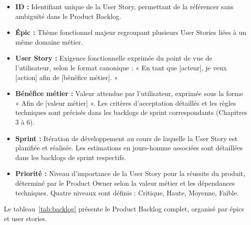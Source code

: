 \begin{itemize}[label=\textbullet, leftmargin=1.5cm, itemsep=0.5cm]
    \item \textbf{ID :} Identifiant unique de la User Story, permettant de la référencer sans ambiguïté dans le Product Backlog.
    \item \textbf{Épic :} Thème fonctionnel majeur regroupant plusieurs User Stories liées à un même domaine métier.
    \item \textbf{User Story :} Exigence fonctionnelle exprimée du point de vue de l'utilisateur, selon le format canonique : « En tant que [acteur], je veux [action] afin de [bénéfice métier]. »
    \item \textbf{Bénéfice métier :} Valeur attendue par l'utilisateur, exprimée sous la forme « Afin de [valeur métier] ». Les critères d'acceptation détaillés et les règles techniques sont précisés dans les backlogs de sprint correspondants (Chapitres 3 à 6).
    \item \textbf{Sprint :} Itération de développement au cours de laquelle la User Story est planifiée et réalisée. Les estimations en jours-homme associées sont détaillées dans les backlogs de sprint respectifs.
    \item \textbf{Priorité :} Niveau d'importance de la User Story pour la réussite du produit, déterminé par le Product Owner selon la valeur métier et les dépendances techniques. Quatre niveaux sont définis : Critique, Haute, Moyenne, Faible.
\end{itemize}

Le tableau~\ref{tab:backlog} présente le Product Backlog complet, organisé par épics et user stories.

\renewcommand{\arraystretch}{1.8}

\renewcommand{\arraystretch}{1.8}

